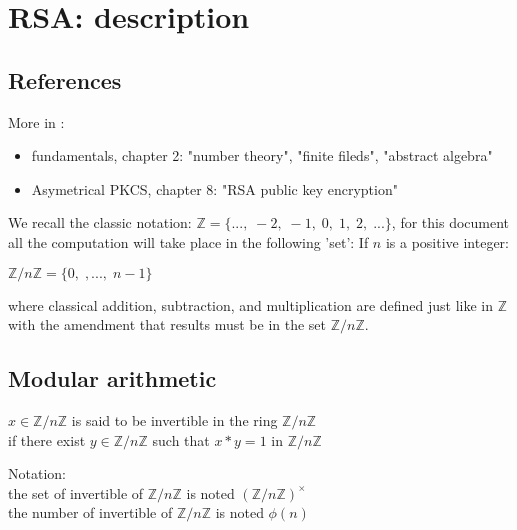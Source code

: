 \newpage 
\section{RSA: description}
\label{Asymmetricalintro}

\subsection{References}

More in \cite{book-1996-menezes} :
\begin{itemize} 
	\item fundamentals, chapter 2: "number theory", "finite fileds", "abstract algebra"
	\item Asymetrical PKCS, chapter 8: "RSA public key encryption"
\end{itemize}

We recall the classic notation: $\mathbb{Z} = \{ ...,\;-2,\;-1,\;0,\;1,\;2,\;...\}$,
 for this document all the computation will take place in the following 'set':
If $n$ is a positive integer:
\begin{center}
$\mathbb{Z}/{n \mathbb{Z}} = \{0,\;,...,\;n-1\}$
\end{center} 
where classical addition, subtraction, and multiplication are defined just like in $\mathbb{Z}$
with the amendment that results must be in the set $\mathbb{Z}/{n \mathbb{Z}}$.
\subsection{Modular arithmetic} 

\vspace{4mm}
\begin{mydef}
$x \in \mathbb{Z}/{n \mathbb{Z}}$ is said to be invertible in the ring 
$\mathbb{Z}/{n \mathbb{Z}}$\\
if there exist $y \in \mathbb{Z}/{n \mathbb{Z}}$
such that $x*y=1$ in $\mathbb{Z}/{n \mathbb{Z}}$ 
\end{mydef}


Notation:\\
the set of invertible of $\mathbb{Z}/{n \mathbb{Z}}$ is noted $ ( \mathbb{Z}/{n \mathbb{Z}} ) ^\times$\\
the number of invertible of $\mathbb{Z}/{n \mathbb{Z}}$ is noted $\phi(n)$

